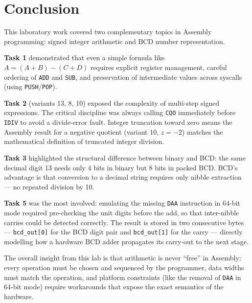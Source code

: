 \documentclass[12pt,a4paper]{article}
\newcommand{\code}[1]{\texttt{\small #1}}
\begin{document}
\newpage

\section{Conclusion}

This laboratory work covered two complementary topics in Assembly programming:
signed integer arithmetic and BCD number representation.

\textbf{Task 1} demonstrated that even a simple formula like
$A = (A + B) - (C + D)$ requires explicit register management, careful
ordering of \code{ADD} and \code{SUB}, and preservation of intermediate values
across syscalls (using \code{PUSH}/\code{POP}).

\textbf{Task 2} (variants 13, 8, 10) exposed the complexity of multi-step
signed expressions. The critical discipline was always calling \code{CQO}
immediately before \code{IDIV} to avoid a divide-error fault. Integer
truncation toward zero means the Assembly result for a negative quotient
(variant 10, $z = -2$) matches the mathematical definition of truncated
integer division.

\textbf{Task 3} highlighted the structural difference between binary and BCD:
the same decimal digit 13 needs only 4 bits in binary but 8 bits in packed
BCD. BCD's advantage is that conversion to a decimal string requires only
nibble extraction --- no repeated division by 10.

\textbf{Task 5} was the most involved: emulating the missing \code{DAA}
instruction in 64-bit mode required pre-checking the unit digits before
the add, so that inter-nibble carries could be detected correctly. The
result is stored in two consecutive bytes --- \code{bcd\_out[0]} for the
BCD digit pair and \code{bcd\_out[1]} for the carry --- directly modelling
how a hardware BCD adder propagates its carry-out to the next stage.

The overall insight from this lab is that arithmetic is never ``free'' in
Assembly: every operation must be chosen and sequenced by the programmer,
data widths must match the operation, and platform constraints (like the
removal of \code{DAA} in 64-bit mode) require workarounds that expose the
exact semantics of the hardware.
\end{document}
